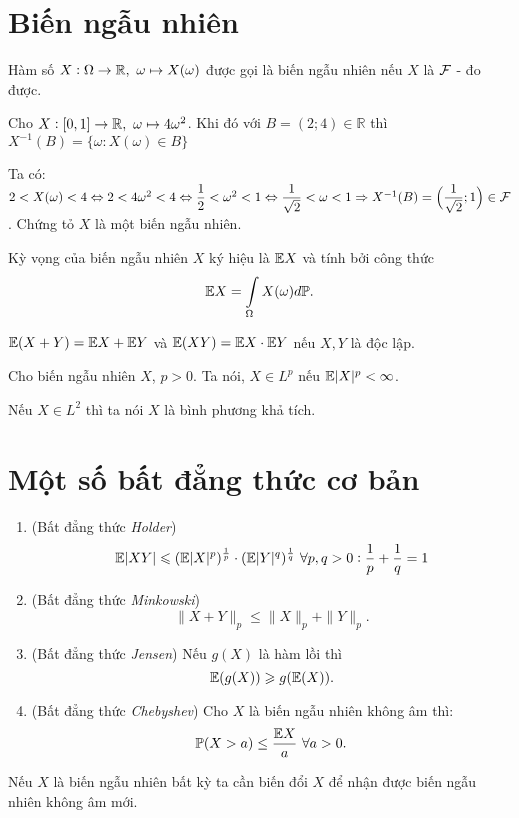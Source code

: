 \section{Biến ngẫu nhiên}
\begin{defn} Hàm số $X: \Omega \to \mathbb{R},~\omega \mapsto X(\omega)$ được gọi là biến ngẫu nhiên nếu $X$ là $\mathcal{F}$ - đo được.
\end{defn}
\begin{exam*}
Cho $X: [0,1] \to \mathbb{R},~\omega \mapsto 4\omega^2$. Khi đó với $ B = (2; 4) \in \mathbb R$ thì $X^{-1}(B) = \{ \omega : X(\omega) \in B \}$
\end{exam*}
\begin{sol*}
    Ta có: $2<X(\omega)<4 \Leftrightarrow 2<4\omega^2<4 \Leftrightarrow \dfrac{1}{2}<\omega^2<1 \Leftrightarrow \dfrac{1}{\sqrt{2}}<\omega<1 \Rightarrow X^{-1}(B) = \Big(\dfrac{1}{\sqrt{2}}; 1\Big) \in \mathcal{F}$. Chứng tỏ $X$ là một biến ngẫu nhiên.
\end{sol*}
\begin{defn}[Kỳ vọng] Kỳ vọng của biến ngẫu nhiên $X$ ký hiệu là $\mathbb{E} X$ và tính bởi công thức
    \[\mathbb{E} X = \displaystyle \displaystyle \int \limits_{\Omega} X(\omega)d\mathbb{P}.\]
\end{defn}
\begin{remark*}
$\mathbb{E}(X + Y) = \mathbb{E} X + \mathbb{E} Y$ và $\mathbb{E}(XY) = \mathbb{E} X\cdot\mathbb{E} Y$ nếu $X, Y$ là độc lập.
\end{remark*}
\begin{defn} Cho biến ngẫu nhiên $X$, $p>0$. Ta nói, $X\in L^p$ nếu $\mathbb{E}|X|^p < \infty$.
\end{defn}
\begin{remark*}
    Nếu $X \in L^2$ thì ta nói $X$ là bình phương khả tích.    
\end{remark*}
\section{Một số bất đẳng thức cơ bản}
\begin{enumerate}
    \item (Bất đẳng thức \textit{Holder})
        \[\mathbb{E}|XY| \leqslant (\mathbb{E}|X|^p)^\frac{1}{p} \cdot (\mathbb{E}|Y|^q)^\frac{1}{q}~\forall p,q>0: \dfrac{1}{p}+\dfrac{1}{q}=1\]
    \item (Bất đẳng thức \textit{Minkowski})
        \[\|X+Y\|_p \leqslant \|X\|_p + \|Y\|_p.\]
    \item (Bất đẳng thức \textit{Jensen}) Nếu $g(X)$ là hàm lồi thì \[\mathbb{E}(g(X)) \geqslant g(\mathbb{E}(X)).\]
    \item (Bất đẳng thức \textit{Chebyshev}) Cho $X$ là biến ngẫu nhiên không âm thì: \[\mathbb{P}(X>a) \leq \dfrac{\mathbb{E} X}{a} ~\forall a>0.\]
\end{enumerate}
\begin{remark*}
    Nếu $X$ là biến ngẫu nhiên bất kỳ ta cần biến đổi $X$ để nhận được biến ngẫu nhiên không âm mới. 
\end{remark*}
